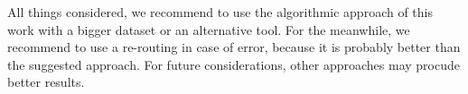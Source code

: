 All things considered, we recommend to use the algorithmic approach of this work with a bigger dataset or an alternative tool. For the meanwhile, we recommend to use a re-routing in case of error, because it is probably better than the suggested approach. For future considerations, other approaches may procude better results.




%




















